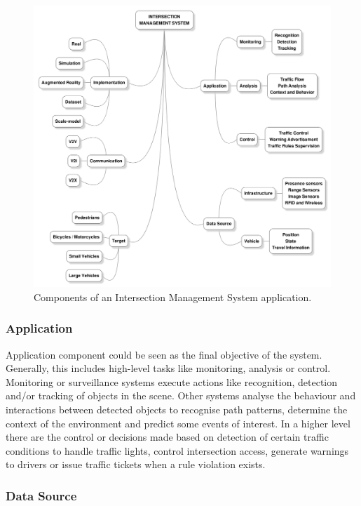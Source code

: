 \begin{figure}[ht!]
\centering
\includegraphics[scale=0.2125]{fig/2/ims_graph2.png}
\caption{Components of an Intersection Management System application.}
\label{imsComps}
\end{figure}

\subsubsection{Application}

Application component could be seen as the final objective of the system. Generally, this includes high-level tasks like monitoring, analysis or control. Monitoring or surveillance systems execute actions like recognition, detection and/or tracking of objects in the scene. 
Other systems analyse the behaviour and interactions between detected objects to recognise path patterns, determine the context of the environment and predict some events of interest. In a higher level there are the control or decisions made based on detection of certain traffic conditions to handle traffic lights, control intersection access, generate warnings to drivers or issue traffic tickets when a rule violation exists.

\subsubsection{Data Source}

